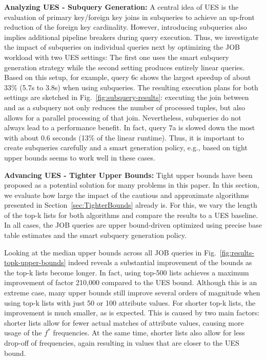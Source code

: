 \textbf{Analyzing UES - Subquery Generation:}
A central idea of UES is the evaluation of primary key/foreign key joins in subqueries to achieve an up-front reduction of the foreign key cardinality. 
However, introducing subqueries also implies additional pipeline breakers during query execution. 
Thus, we investigate the impact of subqueries on individual queries next by optimizing the JOB workload with two UES settings: The first one uses the smart subquery generation strategy while the second setting produces entirely linear queries.
Based on this setup, for example, query 6c shows the largest speedup of about 33\% (5.7s to 3.8s) when using subqueries. 
The resulting execution plans for both settings are sketched in Fig.~\ref{fig:subquery-results}: executing the join between  and  as a subquery not only reduces the number of processed tuples, but also allows for a parallel processing of that join. 
Nevertheless, subqueries do not always lead to a performance benefit. 
In fact, query 7a is slowed down the most with about 0.6 seconds (13\% of the linear runtime). 
Thus, it is important to create subqueries carefully and a smart generation policy, e.g., based on tight upper bounds seems to work well in these cases.



\textbf{Advancing UES - Tighter Upper Bounds:}
Tight upper bounds have been proposed as a potential solution for many problems in this paper. 
In this section, we evaluate how large the impact of the cautious and approximate algorithms presented in Section~\ref{sec:TighterBounds} already is. 
For this, we vary the length of the top-k lists for both algorithms and compare the results to a UES baseline. 
In all cases, the JOB queries are upper bound-driven optimized using precise base table estimates and the smart subquery generation policy.

Looking at the median upper bounds across all JOB queries in Fig.~\ref{fig:results-topk-upper-bounds} indeed reveals a substantial improvement of the bounds as the top-k lists become longer.
In fact, using top-500 lists achieves a maximum improvement of factor 210,000 compared to the UES bound. 
Although this is an extreme case, many upper bounds still improve several orders of magnitude when using top-k lists with just 50 or 100 attribute values. 
For shorter top-k lists, the improvement is much smaller, as is expected. 
This is caused by two main factors: shorter lists allow for fewer actual matches of attribute values, causing more usage of the $f^\ast$ frequencies.
At the same time, shorter lists also allow for less drop-off of frequencies, again resulting in values that are closer to the UES bound.

